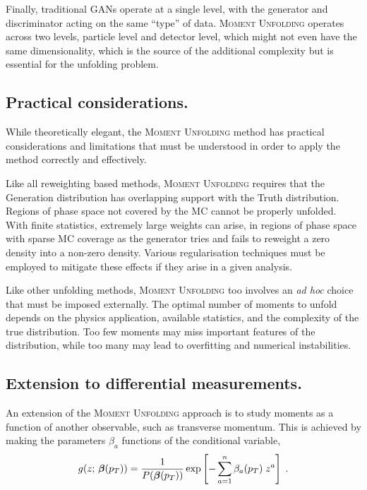         Finally, traditional GANs operate at a single level, with the generator and discriminator acting on the same ``type'' of data.
        \textsc{Moment Unfolding} operates across two levels, particle level and detector level, which might not even have the same dimensionality, which is the source of the additional complexity but is essential for the unfolding problem.
        
    \subsection{Practical considerations.}
        While theoretically elegant, the \textsc{Moment Unfolding} method has practical considerations and limitations that must be understood in order to apply the method correctly and effectively.

        Like all reweighting based methods, \textsc{Moment Unfolding} requires that the Generation distribution has overlapping support with the Truth distribution.
        Regions of phase space not covered by the MC cannot be properly unfolded.
        With finite statistics, extremely large weights can arise, in regions of phase space with sparse MC coverage as the generator tries and fails to reweight a zero density into a non-zero density.
        Various regularisation techniques must be employed to mitigate these effects if they arise in a given analysis.
        
        Like other unfolding methods, \textsc{Moment Unfolding} too involves an \textit{ad hoc} choice that must be imposed externally.
        The optimal number of moments to unfold depends on the physics application, available statistics, and the complexity of the true distribution.
        Too few moments may miss important features of the distribution, while too many may lead to overfitting and numerical instabilities.
    \subsection{Extension to differential measurements.}
        An extension of the \textsc{Moment Unfolding} approach is to study moments as a function of another observable, such as transverse momentum.
        This is achieved by making the parameters $\beta_a$ functions of the conditional variable,
        \[
            \label{eq:pt-moment-gen}
            g(z;\,\vb*\beta\qty(p_T)) = \frac{1}{P\qty(\vb*{\beta}\qty(p_T))} \exp\left[-\sum_{a=1}^n \beta_a(p_T)\; z^a\right]\;.
        \]
        

